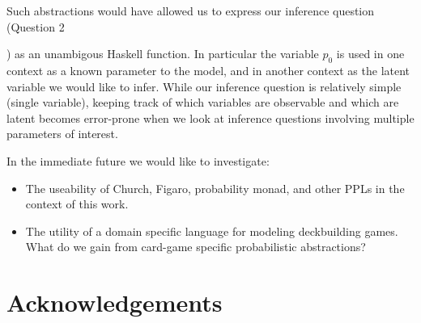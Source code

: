 Such abstractions would have allowed
us to express our inference question (Question 2\ignore{\ref{q:inference}}) as an
unambigous Haskell function. In particular the variable $p_0$ is used in
one context as a known parameter to the model, and in another context as
the latent variable we would like to infer. While our inference question
is relatively simple (single variable), keeping track of which variables
are observable and which are latent becomes error-prone when we look at
inference questions involving multiple parameters of interest.




In the immediate future we would like to investigate:

\begin{itemize}
\item The useability of Church, Figaro, probability monad, and other
      PPLs in the context of this work.
\item The utility of a domain specific language for modeling deckbuilding
      games. What do we gain from card-game specific probabilistic
      abstractions?
\end{itemize}


\section{Acknowledgements} \label{sec:ack}


